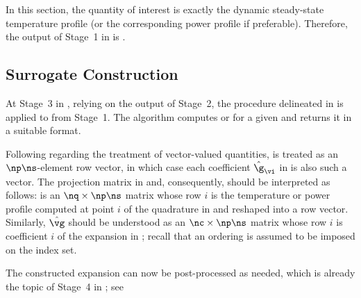 In this section, the quantity of interest \g is exactly the dynamic steady-state
temperature profile \mq (or the corresponding power profile \mp if preferable).
Therefore, the output of Stage~1 in  is
.

\subsection{Surrogate Construction}

At Stage~3 in , relying on the output of Stage~2, the
procedure delineated in  is applied to
 from Stage~1. The algorithm computes
\mp or \mq for a given \vu and returns it in a suitable format.

Following  regarding the treatment of
vector-valued quantities, \g is treated as an $\np \ns$-element row vector, in
which case each coefficient $\hat{\g}_{\vi}$ in  is also
such a vector. The projection matrix in  and,
consequently,  should be interpreted as follows: \vg is an
$\nq \times \np \ns$ matrix whose row $i$ is the temperature or power profile
computed at point $i$ of the quadrature in  and reshaped
into a row vector. Similarly, $\hat{\vg}$ should be understood as an $\nc \times
\np \ns$ matrix whose row $i$ is coefficient $i$ of the expansion in
; recall that an ordering is assumed to be imposed on the
index set.

The constructed expansion can now be post-processed as needed, which is already
the topic of Stage~4 in ; see 
